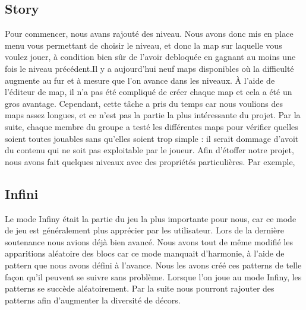 \documentclass [11pt]{report}
\begin{document}
		\subsection{Story}
			\indent Pour commencer, nous avans rajout\'e des niveau. Nous avons donc mis en place menu vous permettant de choisir le niveau, et donc la map sur laquelle vous voulez jouer, \`a condition bien s\^ur de l'avoir debloqu\'ee en gagnant au moins une fois le niveau pr\'ec\'edent.Il y a aujourd'hui neuf maps disponibles o\`u la difficult\'e augmente au fur et \`a mesure que l'on avance dans les niveaux. \`A l'aide de l'\'editeur de map, il n'a pas \'et\'e compliqu\'e de cr\'eer chaque map et cela a \'et\'e un gros avantage. Cependant, cette t\^ache a pris du temps car nous voulions des maps assez longues, et ce n'est pas la partie la plus int\'eressante du projet. Par la suite, chaque membre du groupe a test\'e les diff\'erentes maps pour v\'erifier quelles soient toutes jouables sans qu'elles soient trop simple : il serait dommage d'avoit du contenu qui ne soit pas exploitable par le joueur.
			\indent Afin d'\'etoffer notre projet, nous avons fait quelques niveaux avec des propriétés particuli\`eres. Par exemple, 
		\subsection{Infini}
			Le mode Infiny \'etait la partie du jeu la plus importante pour nous, car ce mode de jeu est g\'en\'eralement plus appr\'ecier par les utilisateur. Lors de la derni\`ere soutenance nous avions d\'ej\`a bien avanc\'e. Nous avons tout de m\^eme modifi\'e les apparitions al\'eatoire des blocs car ce mode manquait d'harmonie, \`a l'aide de pattern que nous avons d\'efini \`a l'avance. Nous les avons cr\'e\'e ces patterns de telle façon qu'il peuvent se suivre sans probl\`eme. Lorsque l'on joue au mode Infiny, les patterns se succ\`ede al\'eatoirement. Par la suite nous pourront rajouter des patterns afin d'augmenter la diversit\'e de d\'ecors.
\newpage
\end{document}
